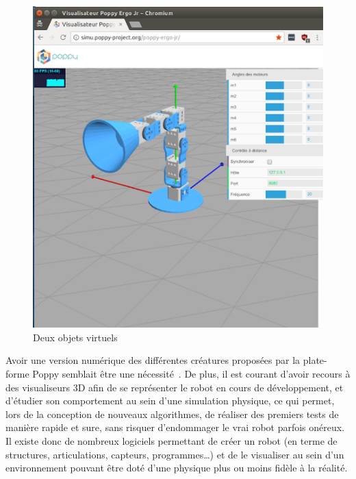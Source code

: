 \begin{figure}[!h]
\begin{minipage}{0.48\linewidth}
                \includegraphics[width=\linewidth]{Figures/Poppy-ErgoJr_visu}
            \end{minipage}
            \caption[Deux objets virtuels: une simulation et une visualisation]{Deux objets virtuels}
            \label{fig:visu_simu}
            \end{figure}\par%
            Avoir une version numérique des différentes créatures proposées par la plate-forme Poppy semblait être une nécessité~. De plus, {il est courant d’avoir recours à des visualiseurs 3D afin de se représenter le robot en cours de développement, et d’étudier son comportement au sein d’une simulation physique, ce qui permet, lors de la conception de nouveaux algorithmes, de réaliser des premiers tests de manière rapide et sure, sans risquer d’endommager le vrai robot parfois onéreux.
            Il existe donc de nombreux logiciels permettant de créer un robot (en terme de structures, articulations, capteurs, programmes\dots) et de le visualiser au sein d’un environnement pouvant être doté d’une physique plus ou moins fidèle à la réalité.}%
